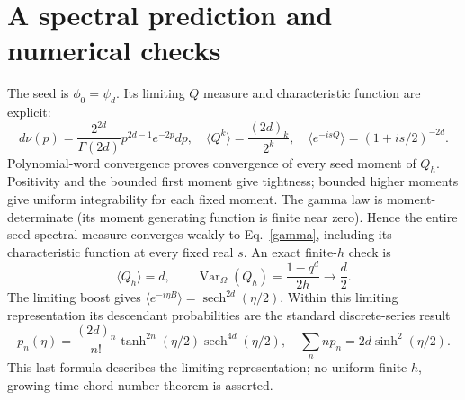 \documentclass[11pt,a4paper]{article}
\DeclareMathOperator{\sech}{sech}
\begin{document}
\newpage
\section{A spectral prediction and numerical checks}
The seed is $\phi_0=\psi_d$. Its limiting $Q$ measure and characteristic
function are explicit:
\begin{equation}
 d\nu(p)=\frac{2^{2d}}{\Gamma(2d)}p^{2d-1}e^{-2p}dp,
 \quad \langle Q^k\rangle=\frac{(2d)_k}{2^k},\quad
 \langle e^{-isQ}\rangle=(1+is/2)^{-2d}.\label{gamma}
\end{equation}
Polynomial-word convergence proves convergence of every seed moment
of $Q_h$. Positivity and the bounded first moment give tightness;
bounded higher moments give uniform integrability for each fixed
moment. The gamma law is moment-determinate (its moment generating
function is finite near zero). Hence the entire seed spectral measure
converges weakly to Eq.~\eqref{gamma}, including its characteristic
function at every fixed real $s$. An exact finite-$h$ check is
\begin{equation}
 \langle Q_h\rangle=d,\qquad
 \operatorname{Var}_\Omega(Q_h)=\frac{1-q^d}{2h}\longrightarrow\frac d2.
\end{equation}
The limiting boost gives $\langle e^{-i\eta B}\rangle=
\sech^{2d}(\eta/2)$. Within this limiting representation its
descendant probabilities are the standard discrete-series result
\begin{equation}
 p_n(\eta)=\frac{(2d)_n}{n!}\tanh^{2n}(\eta/2)
                    \sech^{4d}(\eta/2),\quad
 \sum_n np_n=2d\sinh^2(\eta/2).
\end{equation}
This last formula describes the limiting representation; no uniform
finite-$h$, growing-time chord-number theorem is asserted.
\end{document}
